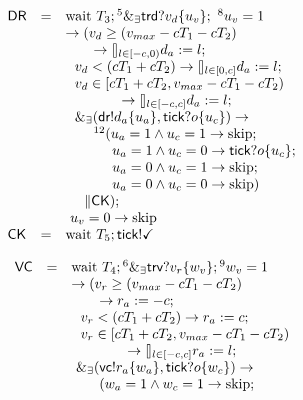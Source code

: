 \documentclass{llncs}
\newcommand{\pskip}{\textmd{skip}}
\newcommand{\pwait}{\textmd{wait}}
\begin{document}
\begin{table}[t]
\small
\begin{minipage}{0.5\linewidth}
\centering
\[\begin{array}{lll}
\textsf{DR} &= &\pwait\ T_3; {}^5 \&_\exists \textsf{trd}?v_d\{u_v\};  \ {}^{8} u_v = 1\\
&& \rightarrow(v_d \geq (v_{max} - cT_1 -cT_2)\\
&& \qquad  \rightarrow \talloblong_{l\in [-c, 0)} d_a:= l; \\
&&  \  \ v_d < (cT_1 + cT_2) \rightarrow \talloblong_{l\in [0, c]} d_a:= l;\\
&&  \  \ v_d \in [cT_1 + cT_2, v_{max} - cT_1 -cT_2)  \\
&& \qquad \qquad   \rightarrow\talloblong_{l\in [-c, c]} d_a:= l;\\
&&  \ \ \&_\exists (\textsf{dr}!d_a\{u_a\}, \textsf{tick}?o\{u_c\}) \rightarrow\\
&&   \qquad{}^{12}(u_a = 1 \wedge u_c = 1 \rightarrow \pskip;\\
&& \quad  \qquad\ u_a = 1 \wedge u_c = 0 \rightarrow \textsf{tick}?o\{u_c\};\\
&& \quad\qquad\  u_a = 0 \wedge u_c = 1 \rightarrow \pskip;\\
&& \quad\qquad\  u_a = 0 \wedge u_c = 0 \rightarrow \pskip)\\
&& \quad \  \| \textsf{CK}
);\\
&& \ u_v = 0 \rightarrow \pskip\\
\textsf{CK} &=& \pwait\ T_5; \textsf{tick}!\checkmark
\end{array} \]
\end{minipage}
\begin{minipage}{0.5\linewidth}
\centering
\[\begin{array}{lll}
\textsf{VC} &= &\pwait\ T_4; {}^{6} \&_\exists \textsf{trv}?v_r\{w_v\}; {}^{9} w_v = 1 \\
&& \rightarrow(v_r \geq (v_{max} - cT_1 - cT_2)\\
&& \qquad \rightarrow  r_a:= -c; \\
&&\ \ v_r <(cT_1 + cT_2) \rightarrow  r_a:= c;\\
&&  \  \ v_r \in [cT_1 + cT_2, v_{max} - cT_1 -cT_2)  \\
&& \qquad \qquad  \rightarrow \talloblong_{l\in [-c, c]} r_a:= l;\\
&& \ \&_\exists (\textsf{vc}!r_a\{w_a\}, \textsf{tick}?o\{w_c\}) \rightarrow\\
&&  \quad \quad(w_a = 1 \wedge w_c = 1 \rightarrow \pskip;\\

\end{array}\]
\end{minipage}
\end{table}
\end{document}
